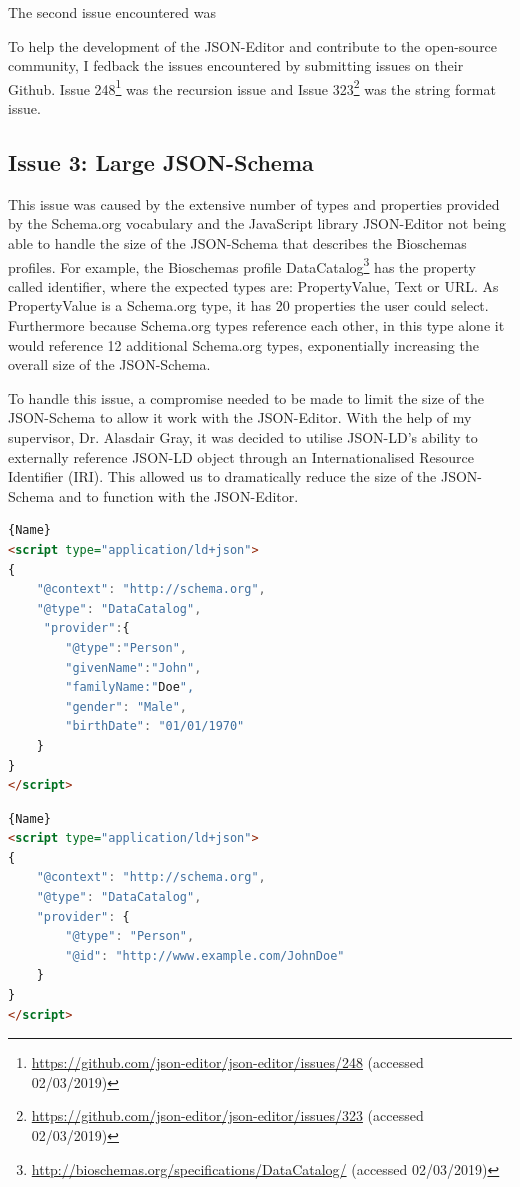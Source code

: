 The second issue encountered was

To help the development of the JSON-Editor and contribute to the open-source community, I fedback the issues encountered by submitting issues on their Github. Issue 248\footnote{\url{https://github.com/json-editor/json-editor/issues/248} (accessed 02/03/2019)} was the recursion issue and Issue 323\footnote{\url{https://github.com/json-editor/json-editor/issues/323} (accessed 02/03/2019)}  was the string format issue. 


\newpage


\subsection{Issue 3: Large JSON-Schema}
This issue was caused by the extensive number of types and properties provided by the Schema.org vocabulary and the JavaScript library JSON-Editor not being able to handle the size of the JSON-Schema that describes the Bioschemas profiles. For example, the Bioschemas profile DataCatalog\footnote{\url{http://bioschemas.org/specifications/DataCatalog/} (accessed 02/03/2019)} has the property called identifier, where the expected types are: PropertyValue, Text or URL. As PropertyValue is a Schema.org type, it has 20 properties the user could select. Furthermore because Schema.org types reference each other, in this type alone it would reference 12 additional Schema.org types, exponentially increasing the overall size of the JSON-Schema.

To handle this issue, a compromise needed to be made to limit the size of the JSON-Schema to allow it work with the JSON-Editor. With the help of my supervisor, Dr. Alasdair Gray, it was decided to utilise JSON-LD's ability to externally reference JSON-LD object through an Internationalised Resource Identifier (IRI). This allowed us to dramatically reduce the size of the JSON-Schema and to function with the JSON-Editor.

\noindent\begin{minipage}{.45\textwidth}
\begin{lstlisting}[caption=code 1, captionpos=b,language=html,showstringspaces=false,basicstyle=\footnotesize,]{Name}
<script type="application/ld+json">
{
    "@context": "http://schema.org",
    "@type": "DataCatalog",
     "provider":{
        "@type":"Person",
        "givenName":"John",
        "familyName:"Doe",
        "gender": "Male",
        "birthDate": "01/01/1970"
    }
}
</script>
\end{lstlisting}
\end{minipage}\hfill
\begin{minipage}{.45\textwidth}
\begin{lstlisting}[caption=code 2, captionpos=b,language=html,showstringspaces=false,basicstyle=\footnotesize]{Name}
<script type="application/ld+json">
{
    "@context": "http://schema.org",
    "@type": "DataCatalog",
    "provider": {
        "@type": "Person",
        "@id": "http://www.example.com/JohnDoe"
    }
}
</script>
\end{lstlisting}
\end{minipage}


